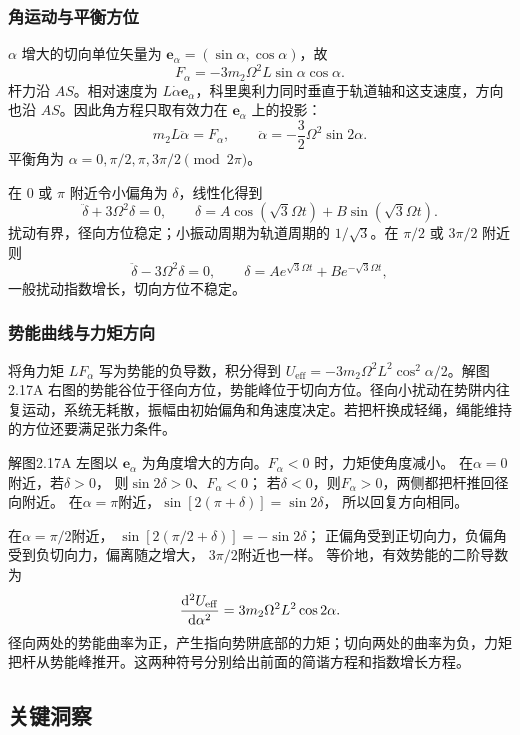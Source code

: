 \documentclass[UTF8,fontset=fandol,a4paper,11pt]{ctexart}
\newcommand{\dd}{\mathop{}\!\mathrm{d}}
\newcommand{\vect}[1]{\bm{#1}}
\begin{document}
\subsubsection*{角运动与平衡方位}
$\alpha$ 增大的切向单位矢量为 $\vect e_\alpha=(\sin\alpha,\cos\alpha)$，故
\[
F_\alpha=-3m_2\Omega^2L\sin\alpha\cos\alpha.
\]
杆力沿 $AS$。相对速度为 $L\dot\alpha\vect e_\alpha$，科里奥利力同时垂直于轨道轴和这支速度，方向也沿 $AS$。因此角方程只取有效力在 $\vect e_\alpha$ 上的投影：
\[
m_2L\ddot\alpha=F_\alpha,\qquad
\ddot\alpha=-\frac32\Omega^2\sin2\alpha.
\]
平衡角为 $\boxed{\alpha=0,\pi/2,\pi,3\pi/2\pmod{2\pi}}$。

在 $0$ 或 $\pi$ 附近令小偏角为 $\delta$，线性化得到
\[
\ddot\delta+3\Omega^2\delta=0,
\qquad \delta=A\cos(\sqrt3\Omega t)+B\sin(\sqrt3\Omega t).
\]
扰动有界，径向方位稳定；小振动周期为轨道周期的 $1/\sqrt3$。在 $\pi/2$ 或 $3\pi/2$ 附近则
\[
\ddot\delta-3\Omega^2\delta=0,
\qquad\delta=Ae^{\sqrt3\Omega t}+Be^{-\sqrt3\Omega t},
\]
一般扰动指数增长，切向方位不稳定。

\subsubsection*{势能曲线与力矩方向}
将角力矩 $LF_\alpha$ 写为势能的负导数，积分得到 $U_{\mathrm{eff}}=-3m_2\Omega^2L^2\cos^2\alpha/2$。解图2.17A 右图的势能谷位于径向方位，势能峰位于切向方位。径向小扰动在势阱内往复运动，系统无耗散，振幅由初始偏角和角速度决定。若把杆换成轻绳，绳能维持的方位还要满足张力条件。

解图2.17A 左图以 $\vect e_\alpha$ 为角度增大的方向。$F_\alpha<0$ 时，力矩使角度减小。
在$\alpha=0$附近，若$\delta>0$，
则$\sin2\delta>0$、$F_\alpha<0$；
若$\delta<0$，则$F_\alpha>0$，两侧都把杆推回径向附近。
在$\alpha=\pi$附近，$\sin[2(\pi+\delta)]=\sin2\delta$，
所以回复方向相同。

在$\alpha=\pi/2$附近，
$\sin[2(\pi/2+\delta)]=-\sin2\delta$；
正偏角受到正切向力，负偏角受到负切向力，偏离随之增大，
$3\pi/2$附近也一样。
等价地，有效势能的二阶导数为
\[
\frac{\dd^2U_{\rm eff}}{\dd\alpha^2}
=3m_2\Omega^2L^2\cos2\alpha.
\]
径向两处的势能曲率为正，产生指向势阱底部的力矩；切向两处的曲率为负，力矩把杆从势能峰推开。这两种符号分别给出前面的简谐方程和指数增长方程。




\subsection*{关键洞察}
\end{document}
